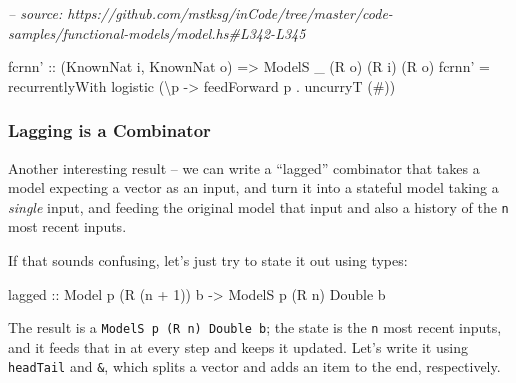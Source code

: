 \documentclass[]{article}
\newenvironment{Shaded}{}{}
\newcommand{\CommentTok}[1]{\textcolor[rgb]{0.38,0.63,0.69}{\textit{#1}}}
\newcommand{\DataTypeTok}[1]{\textcolor[rgb]{0.56,0.13,0.00}{#1}}
\newcommand{\DecValTok}[1]{\textcolor[rgb]{0.25,0.63,0.44}{#1}}
\newcommand{\FunctionTok}[1]{\textcolor[rgb]{0.02,0.16,0.49}{#1}}
\newcommand{\NormalTok}[1]{#1}
\newcommand{\OtherTok}[1]{\textcolor[rgb]{0.00,0.44,0.13}{#1}}
\begin{document}
\begin{Shaded}
\begin{Highlighting}[]
\CommentTok{-- source: https://github.com/mstksg/inCode/tree/master/code-samples/functional-models/model.hs#L342-L345}

\NormalTok{fcrnn'}
\OtherTok{    ::}\NormalTok{ (}\DataTypeTok{KnownNat}\NormalTok{ i, }\DataTypeTok{KnownNat}\NormalTok{ o)}
    \OtherTok{=>} \DataTypeTok{ModelS}\NormalTok{ _ (}\DataTypeTok{R}\NormalTok{ o) (}\DataTypeTok{R}\NormalTok{ i) (}\DataTypeTok{R}\NormalTok{ o)}
\NormalTok{fcrnn' }\FunctionTok{=}\NormalTok{ recurrentlyWith logistic (\textbackslash{}p }\OtherTok{->}\NormalTok{ feedForward p }\FunctionTok{.}\NormalTok{ uncurryT (}\FunctionTok{#}\NormalTok{))}
\end{Highlighting}
\end{Shaded}

\hypertarget{lagging-is-a-combinator}{%
\subsubsection{Lagging is a Combinator}\label{lagging-is-a-combinator}}

Another interesting result -- we can write a ``lagged'' combinator that takes a
model expecting a vector as an input, and turn it into a stateful model taking a
\emph{single} input, and feeding the original model that input and also a
history of the \texttt{n} most recent inputs.

If that sounds confusing, let's just try to state it out using types:

\begin{Shaded}
\begin{Highlighting}[]
\OtherTok{lagged ::} \DataTypeTok{Model}\NormalTok{  p       (}\DataTypeTok{R}\NormalTok{ (n }\FunctionTok{+} \DecValTok{1}\NormalTok{)) b}
       \OtherTok{->} \DataTypeTok{ModelS}\NormalTok{ p (}\DataTypeTok{R}\NormalTok{ n) }\DataTypeTok{Double}\NormalTok{      b}
\end{Highlighting}
\end{Shaded}

The result is a \texttt{ModelS\ p\ (R\ n)\ Double\ b}; the state is the
\texttt{n} most recent inputs, and it feeds that in at every step and keeps it
updated. Let's write it using \texttt{headTail} and \texttt{\&}, which splits a
vector and adds an item to the end, respectively.
\end{document}
